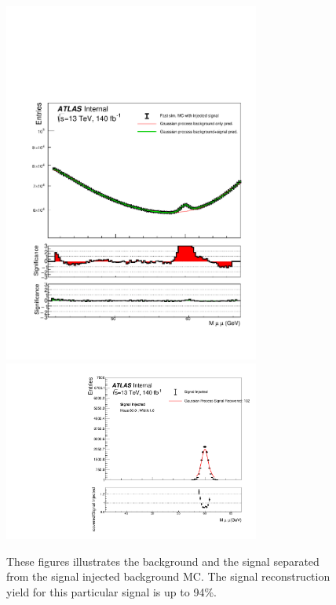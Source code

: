 \begin{figure}[!htb]
    \begin{center}
        \includegraphics[width=0.75\textwidth]{figures/chapter_dimuon//BackgroundSeparated}        
        \includegraphics[width=0.75\textwidth]{figures/chapter_dimuon/SignalSeparated}        
        \caption{
            These figures illustrates the background and the signal separated from the signal injected background MC. The signal reconstruction yield for this particular signal is up to 94\%.
        }
        \label{fig:dimuonmass}
    \end{center}
\end{figure}


